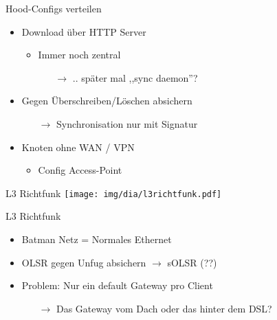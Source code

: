 \begin{frame}{Hood-Configs verteilen}
    \begin{itemize}
        \item Download über HTTP Server
            \begin{itemize}
                \item Immer noch zentral
                \begin{itemize}
                    \item[$\rightarrow$] .. später mal ,,sync daemon''?
                \end{itemize}
            \end{itemize}
        \item Gegen Überschreiben/Löschen absichern
        \begin{itemize}
            \item[$\rightarrow$] Synchronisation nur mit Signatur
        \end{itemize}
        \item Knoten ohne WAN / VPN
        \begin{itemize}
            \item Config Access-Point
        \end{itemize}
    \end{itemize}
\end{frame}

\begin{frame}{L3 Richtfunk}
    \center
    \texttt{[image: img/dia/l3richtfunk.pdf]}
\end{frame}

\begin{frame}{L3 Richtfunk}
    \begin{itemize}
        \item Batman Netz = Normales Ethernet
        \item OLSR gegen Unfug absichern $\rightarrow$ sOLSR (??)
        \item Problem: Nur ein default Gateway pro Client
        \begin{itemize}
            \item[$\rightarrow$] Das Gateway vom Dach oder das hinter dem DSL?
        \end{itemize}
    \end{itemize}
\end{frame}
